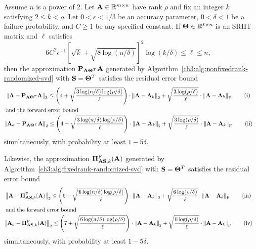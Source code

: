 \begin{thm}
\label{ch3:thm:quality-of-approximation-guarantee-spectral}
Assume $n$ is a power of 2. Let $\mathbf{A} \in \mathbb{R}^{m \times n}$ have rank $\rho$ and fix an integer $k$ satisfying $ 2 \leq k < \rho$. Let $0 < \epsilon < 1/3$
be an accuracy parameter, $0 < \delta < 1$ be a failure probability, and $C \ge 1$ be any specified constant. If $\mathbf{\Theta} \in \mathbb{R}^{\ell \times n}$
is an SRHT matrix and $\ell$ satisfies
\begin{equation}\label{ch3:eqn:rspectral}
 6 C^2 \epsilon^{-1} \left[\sqrt{k} + \sqrt{8\log(n/\delta)} \right]^2 \log(k/\delta) \leq \ell \leq n,
\end{equation}
then the approximation $\mathbf{P}_{\mathbf{A} \mathbf{\Theta}^T} \mathbf{A}$ generated by 
Algorithm~\ref{ch3:alg:nonfixedrank-randomized-svd} with $\mathbf{S} = \mathbf{\Theta}^T$ satisfies
the residual error bound 
\begin{gather}
 \left\|\mathbf{A} - \mathbf{P}_{\mathbf{A}\mathbf{\Theta}^T} \mathbf{A}\right\|_2 \leq \left(4 +
 \sqrt{\frac{3 \log(n/\delta)\log(\rho/\delta)}{\ell}} \right) \cdot \left\|\mathbf{A} - \mathbf{A}_k\right\|_2 +
 \sqrt{\frac{3 \log(\rho/\delta)}{\ell}} \cdot \left\|\mathbf{A} - \mathbf{A}_k\right\|_\mathrm{F} \tag{i} \\
\intertext{ and the forward error bound}
 \left\|\mathbf{A}_k - \mathbf{P}_{\mathbf{A}\mathbf{\Theta}^T} \mathbf{A}\right\|_2 \leq
\left(4 + \sqrt{\frac{3 \log(n/\delta)\log(\rho/\delta)}{\ell}} \right) \cdot \left\|\mathbf{A} - \mathbf{A}_k\right\|_2  +
\sqrt{\frac{3 \log(\rho/\delta)}{\ell}} \cdot \left\|\mathbf{A} - \mathbf{A}_k\right\|_\mathrm{F} \tag{ii}
\end{gather}
simultaneously, with probability at least $1-5 \delta.$

Likewise, the approximation $\boldsymbol{\Pi}_{\mathbf{A}\mathbf{S}, k}^{\mathrm{F}}(\mathbf{A})$ generated
by Algorithm~\ref{ch3:alg:fixedrank-randomized-svd} with $\mathbf{S} = \mathbf{\Theta}^T$
satisfies
the residual error bound
\begin{gather}
  \TNorm{\matA -  \boldPi_{\matA\matS, k}^{\mathrm{F}}(\matA)  } \leq \left(6 +
 \sqrt{\frac{6 \log(n/\delta)\log(\rho/\delta)}{\ell}} \right) \cdot \TNorm{\matA - \matA_k} +
  \sqrt{\frac{6 \log(\rho/\delta)}{\ell}} \cdot \FNorm{\matA - \matA_k} \tag{iii} \\%
\intertext{ and the forward error bound }
  \TNorm{\matA_k - \boldPi_{\matA\matS, k}^{\mathrm{F}}(\matA)} \leq \left(7 +
    \sqrt{\frac{6 \log(n/\delta)\log(\rho/\delta)}{\ell}} \right) \cdot \TNorm{\matA - \matA_k} +
 \sqrt{\frac{6 \log(\rho/\delta)}{\ell}} \cdot \FNorm{\matA - \matA_k} \tag{iv}
\end{gather}
simultaneously, with probability at least $1-5\delta.$
\end{thm}

